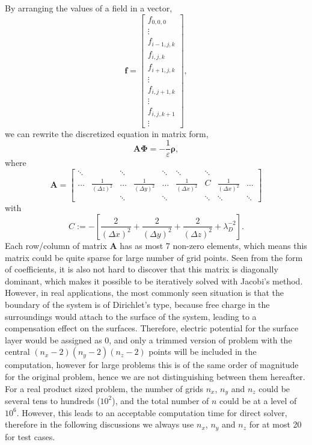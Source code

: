 \documentclass{article}
\begin{document}
\begin{spacing}{1.1}
By arranging the values of a field in a vector,
\[\mathbf{f}=\left[\begin{matrix}f_{0,0,0} \\ \vdots \\ f_{i-1,j,k} \\ f_{i,j,k} \\ f_{i+1,j,k} \\ \vdots \\ f_{i,j+1,k} \\ \vdots \\ f_{i,j,k+1} \\ \vdots\end{matrix}\right],\]
we can rewrite the discretized equation in matrix form,
\[\mathbf{A\Phi}=-\frac{1}{\varepsilon}\mathbf{\rho},\]
where
\[\mathbf{A}=
\left[\begin{matrix}
\ddots & & \ddots & & \ddots & \ddots & \ddots\\
\dots & \frac{1}{(\Delta z)^2} & \dots & \frac{1}{(\Delta y)^2} & \dots & \frac{1}{(\Delta x)^2} & C & \frac{1}{(\Delta x)^2} & \dots\\
& & \ddots & & \ddots & & \ddots & \ddots & \ddots
\end{matrix}\right]\]
with
\[C:=-\left[\frac{2}{(\Delta x)^2}+\frac{2}{(\Delta y)^2}+\frac{2}{(\Delta z)^2}+\lambda_D^{-2}\right].\]
Each row/column of matrix $\mathbf{A}$ has as most 7 non-zero elements, which means this matrix could be quite sparse for large number of grid points. Seen from the form of coefficients, it is also not hard to discover that this matrix is diagonally dominant, which makes it possible to be iteratively solved with Jacobi's method. However, in real applications, the most commonly seen situation is that the boundary of the system is of Dirichlet's type, because free charge in the surroundings would attach to the surface of the system, leading to a compensation effect on the surfaces. Therefore, electric potential for the surface layer would be assigned as 0, and only a trimmed version of problem with the central $(n_x-2)(n_y-2)(n_z-2)$ points will be included in the computation, however for large problems this is of the same order of magnitude for the original problem, hence we are not distinguishing between them hereafter. For a real product sized problem, the number of grids $n_x$, $n_y$ and $n_z$ could be several tens to hundreds ($10^2$), and the total number of $n$ could be at a level of $10^6$. However, this leads to an acceptable computation time for direct solver, therefore in the following discussions we always use $n_x$, $n_y$ and $n_z$ for at most 20 for test cases.


\end{spacing}
\end{document}
